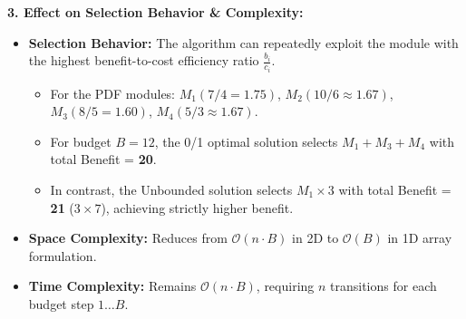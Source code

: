 \documentclass[12pt]{article}
\begin{document}
\textbf{3. Effect on Selection Behavior \& Complexity:}
\begin{itemize}
    \item \textbf{Selection Behavior:} The algorithm can repeatedly exploit the module with the highest benefit-to-cost efficiency ratio $\frac{b_i}{c_i}$.
    \begin{itemize}
        \item For the PDF modules: $M_1 (7/4 = 1.75)$, $M_2 (10/6 \approx 1.67)$, $M_3 (8/5 = 1.60)$, $M_4 (5/3 \approx 1.67)$.
        \item For budget $B = 12$, the 0/1 optimal solution selects $M_1 + M_3 + M_4$ with total Benefit = \textbf{20}.
        \item In contrast, the Unbounded solution selects $M_1 \times 3$ with total Benefit = \textbf{21} ($3 \times 7$), achieving strictly higher benefit.
    \end{itemize}
    \item \textbf{Space Complexity:} Reduces from $\mathcal{O}(n \cdot B)$ in 2D to $\mathcal{O}(B)$ in 1D array formulation.
    \item \textbf{Time Complexity:} Remains $\mathcal{O}(n \cdot B)$, requiring $n$ transitions for each budget step $1 \dots B$.
\end{itemize}
\end{document}
